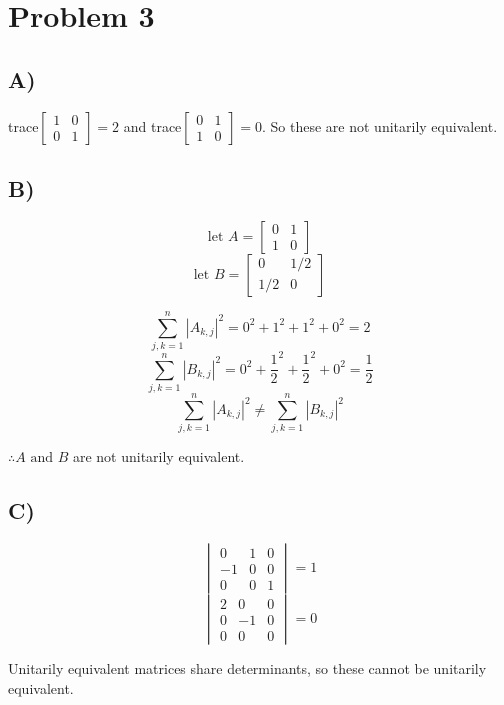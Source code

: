 \documentclass[12pt, letterpaper]{article}
\begin{document}
\section*{Problem 3}

\subsection*{A)}
trace$\begin{bmatrix} 1 & 0 \\ 0 & 1 \end{bmatrix} = 2$ and trace$\begin{bmatrix} 0 & 1 \\ 1 & 0 \end{bmatrix} = 0$. So these are not unitarily equivalent. 

\subsection*{B)}

\[ \text{let } A = \begin{bmatrix} 0 & 1 \\ 1 & 0 \end{bmatrix} \]
\[ \text{let } B = \begin{bmatrix} 0 & 1/2 \\ 1/2 & 0 \end{bmatrix} \]

\[ \sum^n_{j,k=1} |A_{k,j}|^2 = 0^2 + 1^2 + 1^2 + 0^2 = 2 \]
\[ \sum^n_{j,k=1} |B_{k,j}|^2 = 0^2 + \frac{1}{2}^2 + \frac{1}{2}^2 + 0^2 = \frac{1}{2} \]
\[ \sum^n_{j,k=1} |A_{k,j}|^2 \neq \sum^n_{j,k=1} |B_{k,j}|^2 \]

$\therefore A \text{ and } B$ are not unitarily equivalent.

\subsection*{C)}
\[ \begin{vmatrix} 0 & 1 & 0 \\ -1 & 0 & 0 \\ 0 & 0 & 1 \end{vmatrix} = 1 \]
\[ \begin{vmatrix} 2 & 0 & 0 \\ 0 & -1 & 0 \\ 0 & 0 & 0 \end{vmatrix} = 0 \]

Unitarily equivalent matrices share determinants, so these cannot be unitarily equivalent. 
\end{document}
